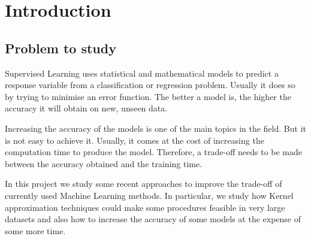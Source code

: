 
\chapter{Introduction} %

\label{Chapter1} %




\section{Problem to study}

\begin{pre-delivery}
  Supervised Learning uses statistical and mathematical models to predict a
  response variable from a classification or regression problem. Usually it does
  so by trying to minimise an error function.
  The better a model is, the higher the accuracy it will obtain on new, unseen
  data.

  Increasing the accuracy of the models is one of the main topics in the field.
  But it is not easy to achieve it. Usually, it comes at the cost of increasing the
  computation time to produce the model. Therefore, a trade-off needs to be
  made between the accuracy obtained and the training time.

  In this project we study some recent approaches to improve the trade-off of
  currently used Machine Learning methods. In particular, we study how
  Kernel approximation techniques could make some procedures feasible in
  very large datasets and also how to increase the accuracy of some models
  at the expense of some more time.
\end{pre-delivery}


